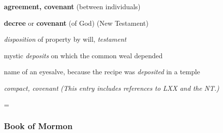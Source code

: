 \begin{compactdesc}
\begin{compactitem}
							\item[4] \textbf{agreement, covenant} (between individuals)
							\item[5] \textbf{decree} or \textbf{covenant} (of God) (New Testament)
						\end{compactitem}
					\item[LSJ 394b, PDF 465] \textbf{}
						\begin{compactitem}
							\item[I] \textit{disposition} of property by will, \textit{testament}
							\item[II1] mystic \textit{deposits} on which the common weal depended
							\item[II2] name of an eyesalve, because the recipe was \textit{deposited} in a temple
							\item[III] \textit{compact, covenant} \textit{(This entry includes references to LXX and the NT.)}
							\item[IV] = 
						\end{compactitem}
				\end{compactdesc}
				
				\begin{compactdesc}
					\item[Some NT uses] \textbf{}
						\begin{compactdesc}
							\item[Matthew 26:28] 
							\item[Mark 14:24] 
							\item[Luke 22:20] 
							\item[1 Corinthians 11:25] 
						\end{compactdesc}
				\end{compactdesc}
		
	\subsubsection{Book of Mormon} %
		\label{COVENANT-BOM}
	
